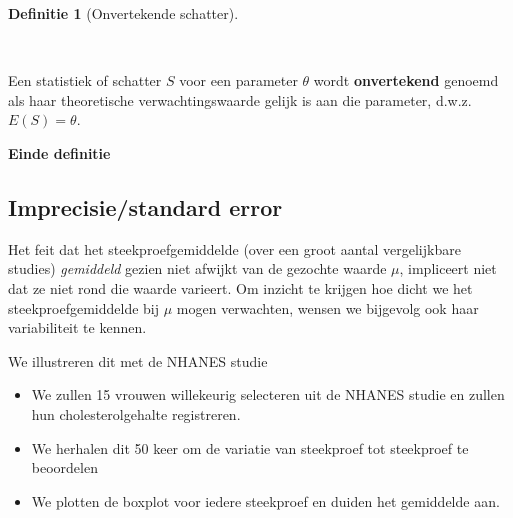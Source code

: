 \documentclass[
  dutch,
  letterpaper,
  12pt]{book}
\providecommand{\tightlist}{%
  \setlength{\itemsep}{0pt}\setlength{\parskip}{0pt}}
\theoremstyle{definition}
\theoremstyle{definition}
\newtheorem{definition}{Definitie}[chapter]
\theoremstyle{definition}
\theoremstyle{remark}
\begin{document}
\begin{definition}[Onvertekende
schatter]\protect\hypertarget{def-onvertekende-schatter}{}\label{def-onvertekende-schatter}

~

\end{definition}

Een statistiek of schatter \(S\) voor een parameter \(\theta\) wordt
\textbf{onvertekend} genoemd als haar theoretische verwachtingswaarde
gelijk is aan die parameter, d.w.z. \(E(S)= \theta\).

\textbf{Einde definitie}

\subsection{Imprecisie/standard error}\label{imprecisiestandard-error}

Het feit dat het steekproefgemiddelde (over een groot aantal
vergelijkbare studies) \emph{gemiddeld} gezien niet afwijkt van de
gezochte waarde \(\mu\), impliceert niet dat ze niet rond die waarde
varieert. Om inzicht te krijgen hoe dicht we het steekproefgemiddelde
bij \(\mu\) mogen verwachten, wensen we bijgevolg ook haar variabiliteit
te kennen.

We illustreren dit met de NHANES studie

\begin{itemize}
\tightlist
\item
  We zullen 15 vrouwen willekeurig selecteren uit de NHANES studie en
  zullen hun cholesterolgehalte registreren.
\item
  We herhalen dit 50 keer om de variatie van steekproef tot steekproef
  te beoordelen
\item
  We plotten de boxplot voor iedere steekproef en duiden het gemiddelde
  aan.
\end{itemize}
\end{document}
